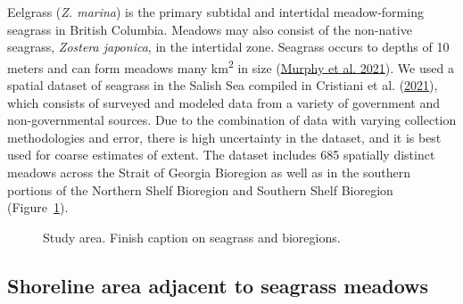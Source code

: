 \documentclass[12pt]{article}\usepackage[]{graphicx}\usepackage[]{color}
\begin{document}
Eelgrass (\emph{Z. marina}) is the primary subtidal and intertidal meadow-forming seagrass in British Columbia. Meadows may also consist of the non-native seagrass, \emph{Zostera japonica}, in the intertidal zone. Seagrass occurs to depths of 10 meters and can form meadows many km\textsuperscript{2} in size (\protect\hyperlink{ref-Murphy2021a}{Murphy et al. 2021}). We used a spatial dataset of seagrass in the Salish Sea compiled in Cristiani et al. (\protect\hyperlink{ref-Cristiani2021}{2021}), which consists of surveyed and modeled data from a variety of government and non-governmental sources. Due to the combination of data with varying collection methodologies and error, there is high uncertainty in the dataset, and it is best used for coarse estimates of extent. The dataset includes 685 spatially distinct meadows across the Strait of Georgia Bioregion as well as in the southern portions of the Northern Shelf Bioregion and Southern Shelf Bioregion (Figure~\ref{fig:studyareafig}).
\begin{figure}[H]

{\centering {} 

}

\caption{Study area. Finish caption on seagrass and bioregions.}\label{fig:studyareafig}
\end{figure}
\hypertarget{shoreline-area-adjacent-to-seagrass-meadows}{%
\subsection{Shoreline area adjacent to seagrass meadows}\label{shoreline-area-adjacent-to-seagrass-meadows}}
\end{document}
